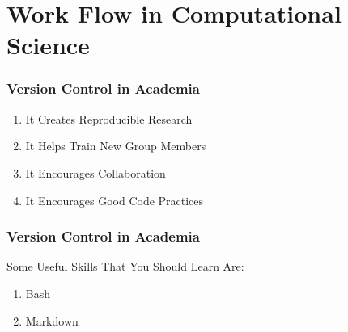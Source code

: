 
\section[Work Flow]{Work Flow in Computational Science}

\begin{frame}
\frametitle{\large{Version Control in Academia}}
\begin{enumerate}
\item It Creates Reproducible Research
\item It Helps Train New Group Members
\item It Encourages Collaboration
\item It Encourages Good Code Practices
\end{enumerate}
\end{frame}

\begin{frame}
\frametitle{\large{Version Control in Academia}}
Some Useful Skills That You Should Learn Are:
\begin{enumerate}
\item Bash
\item Markdown
\end{enumerate}
\end{frame}